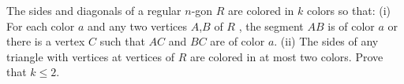 The sides and diagonals of a regular $n$-gon $R$ are colored in $k$ colors so that:
(i) For each color $a$ and any two vertices $A$,$B$ of $R$ , the segment $AB$ is of color $a$ or there is a vertex $C$ such that $AC$ and $BC$ are of color $a$.
(ii) The sides of any triangle with vertices at vertices of $R$ are colored in at most two colors.
Prove that $k\leq  2$.